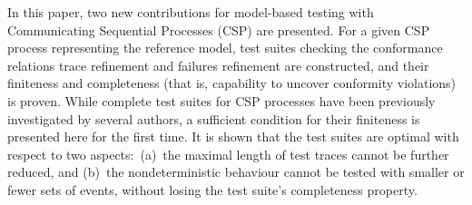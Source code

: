 In this paper, two new contributions for model-based testing with
Communicating Sequential Processes (CSP) are presented. For a given CSP
process representing the reference model, test suites checking the
conformance relations trace refinement and failures refinement are constructed, and
their finiteness and completeness (that is, capability to uncover conformity
violations) is proven. While complete test suites for CSP processes have been
previously investigated by several authors, a sufficient condition for their
finiteness is presented here for the first time.
It is shown that the test suites are optimal with respect to two
aspects:~(a)~the maximal length of test traces cannot be further reduced, and (b)~the
nondeterministic behaviour cannot be tested with smaller or fewer sets of
events, without losing the test suite's completeness property.
